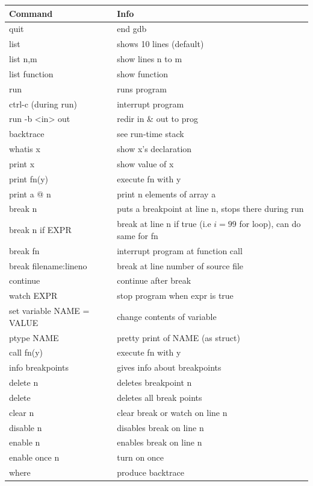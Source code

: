 \documentclass[12 pt]{article}
\begin{document}
\begin{tabularx}{1.0\linewidth}{|X|X|}
  \hline \textbf{Command}&\textbf{Info}
  \\ \hline quit & end gdb
  \\ \hline list & shows 10 lines (default)
  \\ \hline list n,m & show lines n to m
  \\ \hline list function & show function
  \\ \hline run & runs program
  \\ \hline ctrl-c (during run) & interrupt program
  \\ \hline run -b <in> out & redir in \& out to prog
  \\ \hline backtrace & see run-time stack
  \\ \hline whatis x & show x's declaration
  \\ \hline print x & show value of x
  \\ \hline print fn(y) & execute fn with y
  \\ \hline print a @ n & print n elements of array a
  \\ \hline break n & puts a breakpoint at line n, stops there during run
  \\ \hline break n if EXPR & break at line n if true (i.e $i=99$ for loop), can do same for fn
  \\ \hline break fn & interrupt program at function call
  \\ \hline break filename:lineno & break at line number of source file
  \\ \hline continue & continue after break
  \\ \hline watch EXPR & stop program when expr is true
  \\ \hline set variable NAME = VALUE & change contents of variable
  \\ \hline ptype NAME & pretty print of NAME (as struct)
  \\ \hline call fn(y) & execute fn with y
  \\ \hline info breakpoints & gives info about breakpoints
  \\ \hline delete n & deletes breakpoint n
  \\ \hline delete & deletes all break points
  \\ \hline clear n & clear break or watch on line n
  \\ \hline disable n & disables break on line n
  \\ \hline enable n & enables break on line n
  \\ \hline enable once n & turn on once
  \\ \hline where & produce backtrace
  \\ \hline
\end{tabularx}
\end{document}
